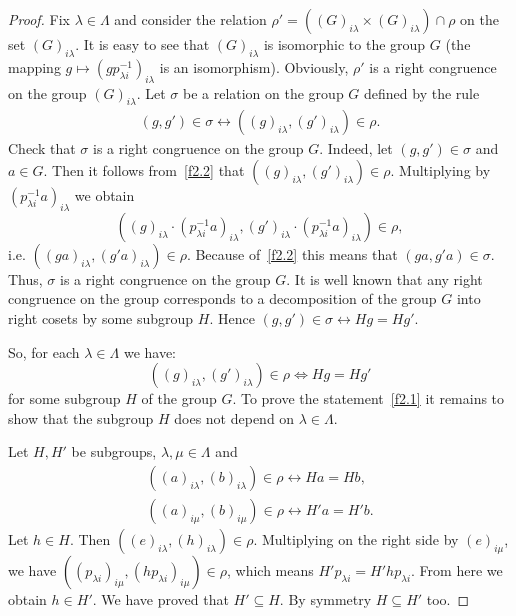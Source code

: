 \documentclass{birkau}
\numberwithin{equation}{section}
\theoremstyle{plain}
\theoremstyle{definition}
\begin{document}
	\begin{proof}
	    Fix $\lambda \in \Lambda$ and consider the relation $\rho' = ((G)_{i \lambda} \times (G)_{i \lambda}) \cap \rho$ on the set $(G)_{i \lambda}$. It is easy to see that $(G)_{i \lambda}$ is isomorphic to the group $G$ (the mapping $g \mapsto (g p_{\lambda i}^{-1})_{i \lambda}$ is an isomorphism). Obviously, $\rho'$ is a right congruence on the group $(G)_{i \lambda}$. Let $\sigma$ be a relation on the group $G$ defined by the rule
		\begin{gather}
			(g,g') \in \sigma \leftrightarrow ((g)_{i \lambda},(g')_{i \lambda}) \in \rho. \label{f2.2}
		\end{gather}
		Check that $\sigma$ is a right congruence on the group $G$. Indeed, let $(g,g') \in \sigma$ and $a \in G$. Then it follows from~\eqref{f2.2} that $((g)_{i \lambda},(g')_{i \lambda}) \in \rho$. Multiplying by $(p_{\lambda i}^{-1} a)_{i \lambda}$ we obtain $$ ((g)_{i \lambda} \cdot (p_{\lambda i}^{-1} a)_{i \lambda},(g')_{i \lambda} \cdot (p_{\lambda i}^{-1} a)_{i \lambda}) \in \rho, $$ i.e. $ ((g a)_{i \lambda},(g' a)_{i \lambda}) \in \rho $. Because of~\eqref{f2.2} this means that $(ga,g'a) \in \sigma$. Thus, $\sigma$ is a right congruence on the group $G$. It is well known that any right congruence on the group corresponds to a decomposition of the group $G$ into right cosets by some subgroup $H$. Hence $(g,g') \in \sigma \leftrightarrow Hg = Hg'$.
		
		So, for each $\lambda \in \Lambda$ we have: $$ ((g)_{i \lambda},(g')_{i \lambda}) \in \rho \Leftrightarrow Hg = Hg' $$ for some subgroup $H$ of the group $G$. To prove the statement~\eqref{f2.1} it remains to show that the subgroup $H$ does not depend on $\lambda \in \Lambda$.
		
		\par Let $H,H'$ be subgroups, $\lambda,\mu \in \Lambda$ and
		\begin{gather*}
			((a)_{i \lambda},(b)_{i \lambda}) \in \rho \leftrightarrow Ha = Hb, \\
			((a)_{i \mu},(b)_{i \mu}) \in \rho \leftrightarrow H'a = H'b.
		\end{gather*}
		Let $h \in H$. Then $((e)_{i \lambda},(h)_{i \lambda}) \in \rho$. Multiplying on the right side by $(e)_{i \mu}$, we have $((p_{\lambda i})_{i \mu}, (h p_{\lambda i})_{i \mu}) \in \rho$, which means $H' p_{\lambda i} = H' h p_{\lambda i}$. From here we obtain $h \in H'$. We have proved that $H' \subseteq H$. By symmetry $H \subseteq H'$ too.
	\end{proof}
	
\end{document}
